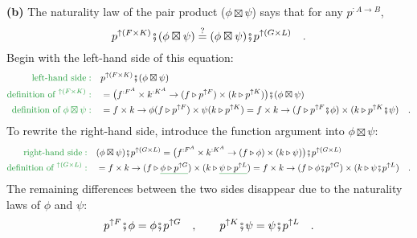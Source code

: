 \textbf{(b)} The naturality law of the pair product ($\phi\boxtimes\psi$)
says that for any $p^{:A\rightarrow B}$,
\[
p^{\uparrow(F\times K)}\bef(\phi\boxtimes\psi)\overset{?}{=}(\phi\boxtimes\psi)\bef p^{\uparrow(G\times L)}\quad.
\]
Begin with the left-hand side of this equation:
\begin{align*}
{\color{greenunder}\text{left-hand side}:}\quad & p^{\uparrow(F\times K)}\bef(\phi\boxtimes\psi)\\
{\color{greenunder}\text{definition of }^{\uparrow(F\times K)}:}\quad & =\big(f^{:F^{A}}\times k^{:K^{A}}\rightarrow(f\triangleright p^{\uparrow F})\times(k\triangleright p^{\uparrow K})\big)\bef(\phi\boxtimes\psi)\\
{\color{greenunder}\text{definition of }\phi\boxtimes\psi:}\quad & =f\times k\rightarrow\phi(f\triangleright p^{\uparrow F})\times\psi(k\triangleright p^{\uparrow K})=f\times k\rightarrow(f\triangleright p^{\uparrow F}\bef\phi)\times(k\triangleright p^{\uparrow K}\bef\psi)\quad.
\end{align*}
To rewrite the right-hand side, introduce the function argument into
$\phi\boxtimes\psi$:
\begin{align*}
{\color{greenunder}\text{right-hand side}:}\quad & (\phi\boxtimes\psi)\bef p^{\uparrow(G\times L)}=\big(f^{:F^{A}}\times k^{:K^{A}}\rightarrow(f\triangleright\phi)\times(k\triangleright\psi)\big)\bef p^{\uparrow(G\times L)}\\
{\color{greenunder}\text{definition of }^{\uparrow(G\times L)}:}\quad & =f\times k\rightarrow(f\triangleright\gunderline{\phi\triangleright p^{\uparrow G}})\times(k\triangleright\gunderline{\psi\triangleright p^{\uparrow L}})=f\times k\rightarrow(f\triangleright\phi\bef p^{\uparrow G})\times(k\triangleright\psi\bef p^{\uparrow L})\quad.
\end{align*}
The remaining differences between the two sides disappear due to the
naturality laws of $\phi$ and $\psi$:
\[
p^{\uparrow F}\bef\phi=\phi\bef p^{\uparrow G}\quad,\quad\quad p^{\uparrow K}\bef\psi=\psi\bef p^{\uparrow L}\quad.
\]

